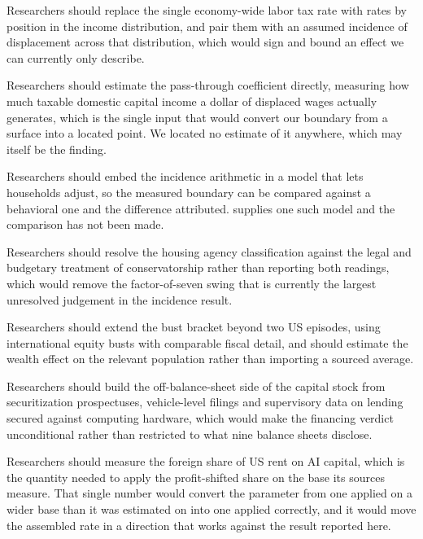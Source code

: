 \begin{description}[leftmargin=2.4em,style=nextline]
  \item[FR5] Researchers should replace the single economy-wide labor tax rate with rates by
  position in the income distribution, and pair them with an assumed incidence of displacement
  across that distribution, which would sign and bound an effect we can currently only describe.

  \item[FR6] Researchers should estimate the pass-through coefficient directly, measuring how
  much taxable domestic capital income a dollar of displaced wages actually generates, which is
  the single input that would convert our boundary from a surface into a located point. We
  located no estimate of it anywhere, which may itself be the finding.

  \item[FR7] Researchers should embed the incidence arithmetic in a model that lets households
  adjust, so the measured boundary can be compared against a behavioral one and the difference
  attributed. \citet{Bayraktar2026} supplies one such model and the comparison has not been made.

  \item[FR8] Researchers should resolve the housing agency classification against the legal and
  budgetary treatment of conservatorship rather than reporting both readings, which would remove
  the factor-of-seven swing that is currently the largest unresolved judgement in the incidence
  result.

  \item[FR9] Researchers should extend the bust bracket beyond two US episodes, using
  international equity busts with comparable fiscal detail, and should estimate the wealth effect
  on the relevant population rather than importing a sourced average.

  \item[FR10] Researchers should build the off-balance-sheet side of the capital stock from
  securitization prospectuses, vehicle-level filings and supervisory data on lending secured
  against computing hardware, which would make the financing verdict unconditional rather than
  restricted to what nine balance sheets disclose.

  \item[FR11] Researchers should measure the foreign share of US rent on AI capital, which is
  the quantity needed to apply the profit-shifted share on the base its sources measure. That
  single number would convert the parameter from one applied on a wider base than it was
  estimated on into one applied correctly, and it would move the assembled rate in a direction
  that works against the result reported here.

\end{description}

